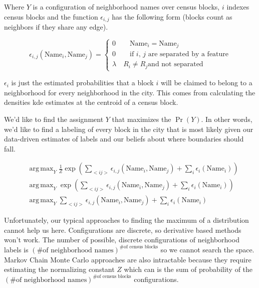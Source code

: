 \documentclass{article}
\DeclareMathOperator*{\argmax}{arg\,max}
\begin{document}
Where $Y$ is a configuration of neighborhood names over census blocks,
$i$ indexes census blocks and the function $\epsilon_{i,j}$ has the
following form (blocks count as neighbors if they share any edge).

\begin{equation}
\epsilon_{i,j}(\text{Name}_i,\text{Name}_j) = \begin{cases}
  0 \quad\quad \text{Name}_i = \text{Name}_j \\
  0 \quad\quad \text{if $i$, $j$ are separated by a feature} \\
  \lambda \quad R_i \neq R_j \text{and not separated}
\end{cases}
\end{equation}

$\epsilon_i$ is just the estimated probabilities that a block $i$ will
be claimed to belong to a neighborhood for every neighborhood in the
city. This comes from calculating the densities kde estimates at the
centroid of a census block.

We'd like to find the assignment $Y$ that maximizes the $\Pr(Y)$. In
other words, we'd like to find a labeling of every block in the city
that is most likely given our data-driven estimates of labels and our
beliefs about where boundaries should fall.

\begin{align*}
&\argmax_Y \frac{1}{Z}\operatorname{exp}\left(\sum_{<i j>}\epsilon_{i,j}(\text{Name}_i,\text{Name}_j) + \sum_i\epsilon_i(\text{Name}_i)\right) \\
&\argmax_Y \operatorname{exp}\left(\sum_{<i j>}\epsilon_{i,j}(\text{Name}_i,\text{Name}_j) + \sum_i\epsilon_i(\text{Name}_i)\right) \\
&\argmax_Y \sum_{<i j>}\epsilon_{i,j}(\text{Name}_i,\text{Name}_j) + \sum_i\epsilon_i(\text{Name}_i)
\end{align*}

Unfortunately, our typical approaches to finding the maximum of a
distribution cannot help us here. Configurations are discrete, so
derivative based methods won't work. The number of possible, discrete
configurations of neighborhood labels is $(\text{\# of neighborhood
names})^{\text{\# of census blocks}}$ so we cannot search the space. Markov
Chain Monte Carlo approaches are also intractable because they require
estimating the normalizing constant $Z$ which can is the sum of
probability of the  $(\text{\# of neighborhood names})^{\text{\# of census blocks}}$ 
configurations.
\end{document}
